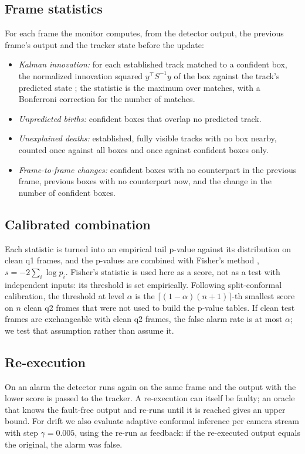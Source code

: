\documentclass[11pt]{article}
\begin{document}
\subsection{Frame statistics}
For each frame the monitor computes, from the detector output, the previous frame's output and the tracker state before the update:
\begin{itemize}
\item \emph{Kalman innovation:} for each established track matched to a confident box, the normalized innovation squared $y^\top S^{-1} y$ of the box against the track's predicted state \citep{barshalom2001}; the statistic is the maximum over matches, with a Bonferroni correction for the number of matches.
\item \emph{Unpredicted births:} confident boxes that overlap no predicted track.
\item \emph{Unexplained deaths:} established, fully visible tracks with no box nearby, counted once against all boxes and once against confident boxes only.
\item \emph{Frame-to-frame changes:} confident boxes with no counterpart in the previous frame, previous boxes with no counterpart now, and the change in the number of confident boxes.
\end{itemize}

\subsection{Calibrated combination}
Each statistic is turned into an empirical tail p-value against its distribution on clean q1 frames, and the p-values are combined with Fisher's method \citep{fisher1925}, $s = -2\sum_i \log p_i$. Fisher's statistic is used here as a score, not as a test with independent inputs: its threshold is set empirically. Following split-conformal calibration, the threshold at level $\alpha$ is the $\lceil(1-\alpha)(n+1)\rceil$-th smallest score on $n$ clean q2 frames that were not used to build the p-value tables. If clean test frames are exchangeable with clean q2 frames, the false alarm rate is at most $\alpha$; we test that assumption rather than assume it.

\subsection{Re-execution}
On an alarm the detector runs again on the same frame and the output with the lower score is passed to the tracker. A re-execution can itself be faulty; an oracle that knows the fault-free output and re-runs until it is reached gives an upper bound. For drift we also evaluate adaptive conformal inference \citep{gibbs2021aci} per camera stream with step $\gamma=0.005$, using the re-run as feedback: if the re-executed output equals the original, the alarm was false.
\end{document}

